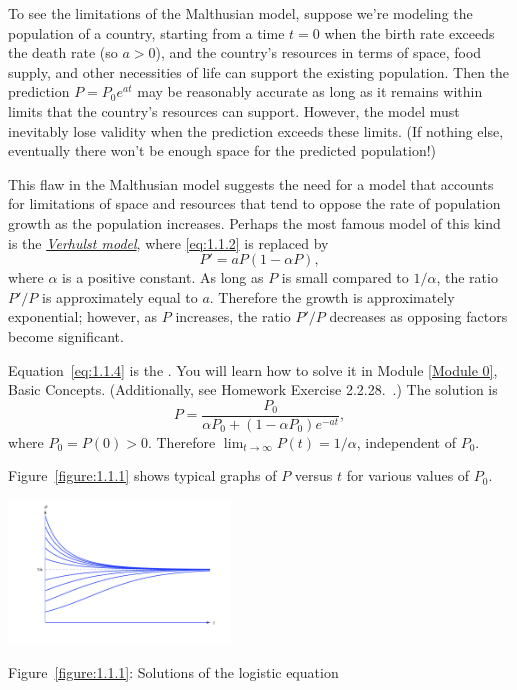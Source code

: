 \documentclass{ximera}
\begin{document}
To see the limitations of the Malthusian model, suppose  we're
modeling the  population of a country, starting from a time
$t=0$ when the birth rate exceeds the death rate (so $a>0$), and
the country's resources in terms of space, food supply, and other
necessities of life can support the existing population. Then the
prediction $P=P_0e^{at}$ may be reasonably accurate as long as
it remains within limits that the country's resources can support.
However, the model must inevitably lose validity when the prediction
exceeds these limits. (If nothing else, eventually there won't be
enough space for the predicted population!)

This flaw in the Malthusian model suggests the need for a model that
accounts for limitations of space and resources that tend to oppose
the rate of population growth as the population increases.
 Perhaps the most famous model of this kind is the
\href{http://www-history.mcs.st-and.ac.uk/Mathematicians/Verhulst.html}
{\color{blue}\it Verhulst
 model\/}, where \eqref{eq:1.1.2} is
replaced by
\begin{equation} \label{eq:1.1.4}
P'=aP(1-\alpha P),
\end{equation}
where $\alpha$ is a positive constant.
As long as $P$ is small
compared to $1/\alpha$, the ratio $P'/P$  is approximately equal to $a$.
Therefore the growth is approximately exponential;     however, as $P$
increases, the ratio $P'/P$  decreases as opposing factors
become significant.

Equation~\eqref{eq:1.1.4} is  the . You
will learn how to solve it in Module \ref{Module 0}, Basic Concepts.
(Additionally, see Homework Exercise 2.2.28.~\hspace*{-3pt}.)
The solution is
$$
P=\frac{P_0}{\alpha P_0+(1-\alpha P_0)e^{-at}},
$$
where $P_0=P(0)>0$. Therefore
$\lim_{t\to\infty}P(t)=1/\alpha$, independent of $P_0$.

Figure~\ref{figure:1.1.1} shows typical graphs of $P$ versus $t$ for
various values of  $P_0$.

\begin{image}
  \includegraphics[height=1.5in]{fig010101.jpg}
\end{image}
{\centering
\color{blue}\label{figure:1.1.1}
 \caption{Figure~\ref{figure:1.1.1}: Solutions of the logistic equation}

 }
 
\end{document}
